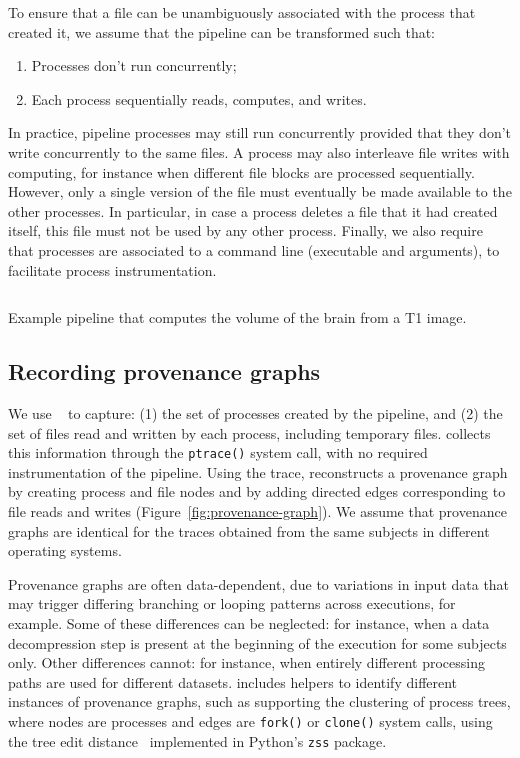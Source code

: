 To ensure that a file can be unambiguously associated with the process that
created it, we assume that the pipeline can be transformed such that:
\begin{enumerate}
\item Processes don't run concurrently;
\item Each process sequentially reads, computes, and writes.
\end{enumerate}
In practice, pipeline processes may still run concurrently provided that
they don't write concurrently to the same files. A process may also
interleave file writes with computing, for instance when different file
blocks are processed sequentially. However, only a single version of the
file must eventually be made available to the other processes. In
particular, in case a process deletes a file that it had created itself,
this file must not be used by any other process. Finally, we also require that processes are
associated to a command line (executable and arguments), to facilitate
process instrumentation.

\begin{listing}
  \inputminted{bash}{"chapters/chapter1/data/example/example.sh"}
  \caption{Example pipeline that computes the volume of the brain from a T1 image.}
  \label{listing:sample-script}
\end{listing}


\subsection{Recording provenance graphs}

We use \reprozip~\cite{rampin2016reprozip}
to capture: (1) the set of processes created by the
pipeline, and
(2) the set of files read and written by each process, including
temporary files. \reprozip collects this information through the
\texttt{ptrace()} system call, with no required instrumentation of the pipeline.
Using the \reprozip trace, \toolname reconstructs a provenance graph by creating process and file
nodes and by adding directed edges corresponding
to file reads and writes (Figure~\ref{fig:provenance-graph}).
We assume that provenance graphs are identical for the \reprozip traces obtained from
the same subjects in different operating systems.

Provenance graphs are often data-dependent, due to variations in input data that
may trigger differing branching or looping patterns across executions, for example.
Some of these differences can be neglected: for instance, when a data
decompression step is present at the beginning of the execution for some
subjects only. Other differences cannot: for instance, when entirely
different processing paths are used for different datasets. \toolname
includes helpers to identify different instances of provenance graphs,
such as supporting the clustering of process trees, where nodes are processes and
edges are \texttt{fork()} or \texttt{clone()} system calls, using the tree
edit distance~\cite{zhang1989simple} implemented in Python's \texttt{zss} package.

